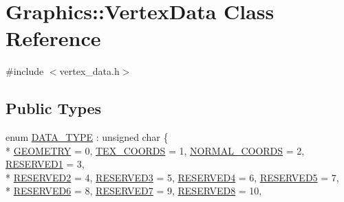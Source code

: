 \hypertarget{class_graphics_1_1_vertex_data}{}\section{Graphics\+:\+:Vertex\+Data Class Reference}
\label{class_graphics_1_1_vertex_data}


{\ttfamily \#include $<$vertex\+\_\+data.\+h$>$}

\subsection*{Public Types}
\begin{DoxyCompactItemize}
\item 
enum \hyperlink{class_graphics_1_1_vertex_data_a50e88236939dc2a3ec4df7aeb728620e}{D\+A\+T\+A\+\_\+\+T\+Y\+P\+E} \+: unsigned char \{ \\*
\hyperlink{class_graphics_1_1_vertex_data_a50e88236939dc2a3ec4df7aeb728620eab4b2880ea86c8ee2eaceee4fbf35d3ac}{G\+E\+O\+M\+E\+T\+R\+Y} = 0, 
\hyperlink{class_graphics_1_1_vertex_data_a50e88236939dc2a3ec4df7aeb728620ea7b93224f58c43662f5be328f032d01e4}{T\+E\+X\+\_\+\+C\+O\+O\+R\+D\+S} = 1, 
\hyperlink{class_graphics_1_1_vertex_data_a50e88236939dc2a3ec4df7aeb728620ea0dbe0aa86a7dc55ca3aef237b0084068}{N\+O\+R\+M\+A\+L\+\_\+\+C\+O\+O\+R\+D\+S} = 2, 
\hyperlink{class_graphics_1_1_vertex_data_a50e88236939dc2a3ec4df7aeb728620ea77588319217115a8d9dead081e341e83}{R\+E\+S\+E\+R\+V\+E\+D1} = 3, 
\\*
\hyperlink{class_graphics_1_1_vertex_data_a50e88236939dc2a3ec4df7aeb728620ea9c6b6dd55ddf236f667e3e4019cda8d7}{R\+E\+S\+E\+R\+V\+E\+D2} = 4, 
\hyperlink{class_graphics_1_1_vertex_data_a50e88236939dc2a3ec4df7aeb728620eafc91ad501328ae49126c5d4bf850e537}{R\+E\+S\+E\+R\+V\+E\+D3} = 5, 
\hyperlink{class_graphics_1_1_vertex_data_a50e88236939dc2a3ec4df7aeb728620ea2185ed1920c6eeea484c4050e149764d}{R\+E\+S\+E\+R\+V\+E\+D4} = 6, 
\hyperlink{class_graphics_1_1_vertex_data_a50e88236939dc2a3ec4df7aeb728620ea92ff06fddd97b8c7d306ff7e912aeaba}{R\+E\+S\+E\+R\+V\+E\+D5} = 7, 
\\*
\hyperlink{class_graphics_1_1_vertex_data_a50e88236939dc2a3ec4df7aeb728620ea815ed3d3f65efe3a61a3df584a8fad55}{R\+E\+S\+E\+R\+V\+E\+D6} = 8, 
\hyperlink{class_graphics_1_1_vertex_data_a50e88236939dc2a3ec4df7aeb728620ead297e598e1a3dd7e9f7f3cc624130de9}{R\+E\+S\+E\+R\+V\+E\+D7} = 9, 
\hyperlink{class_graphics_1_1_vertex_data_a50e88236939dc2a3ec4df7aeb728620ea8f0a8e69a480d1dfb0f671acd6f72249}{R\+E\+S\+E\+R\+V\+E\+D8} = 10, 

\end{DoxyCompactItemize}

